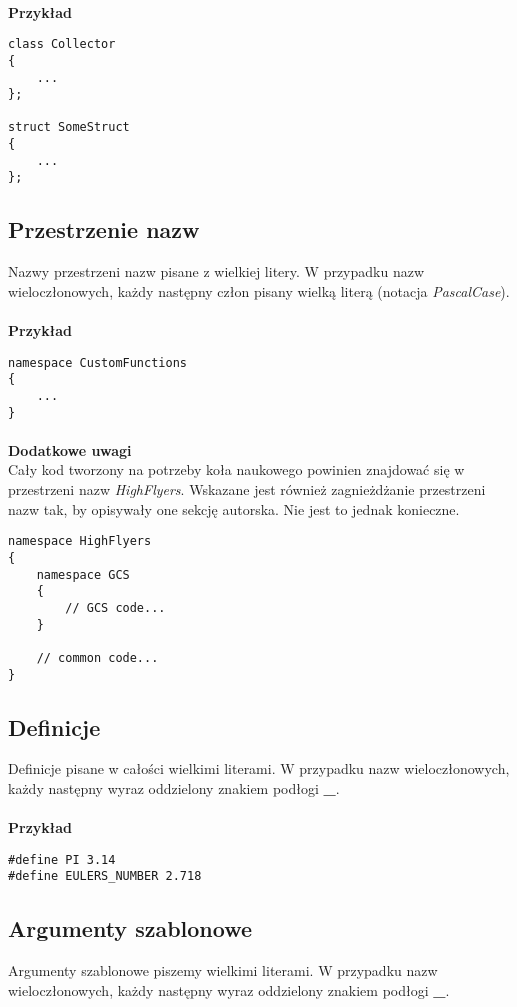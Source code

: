 \documentclass[titlepage]{article}
\begin{document}
\paragraph{}
\textbf{Przykład}
\begin{lstlisting}
class Collector
{
	...
};

struct SomeStruct
{
	...
};
\end{lstlisting}
\subsection{Przestrzenie nazw}
Nazwy przestrzeni nazw pisane z wielkiej litery. W przypadku nazw wieloczłonowych, każdy następny człon pisany wielką literą (notacja \textit{PascalCase}).
\paragraph{}
\textbf{Przykład}
\begin{lstlisting}
namespace CustomFunctions
{
	...
}
\end{lstlisting}
\paragraph{}
\textbf{Dodatkowe uwagi} \\
Cały kod tworzony na potrzeby koła naukowego powinien znajdować się w przestrzeni nazw \textit{HighFlyers}. Wskazane jest również zagnieżdżanie przestrzeni nazw tak, by opisywały one sekcję autorska. Nie jest to jednak konieczne.
\begin{lstlisting}
namespace HighFlyers
{
	namespace GCS
	{
		// GCS code...
	}

	// common code...
}
\end{lstlisting}
\subsection{Definicje}
Definicje pisane w całości wielkimi literami. W przypadku nazw wieloczłonowych, każdy następny wyraz oddzielony znakiem podłogi \textbf{\_}.
\paragraph{}
\textbf{Przykład}
\begin{lstlisting}
#define PI 3.14
#define EULERS_NUMBER 2.718
\end{lstlisting}
\subsection{Argumenty szablonowe}
Argumenty szablonowe piszemy wielkimi literami. W przypadku nazw wieloczłonowych, każdy następny wyraz oddzielony znakiem podłogi \textbf{\_}.
\end{document}
